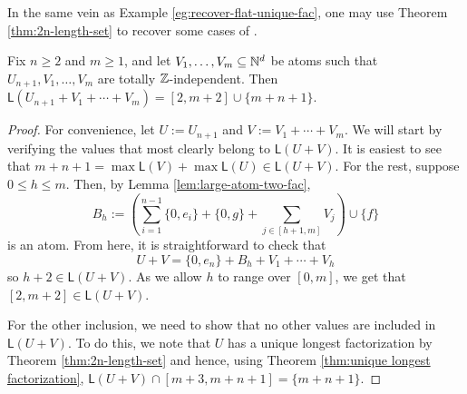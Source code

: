 \begin{rk}
In the same vein as Example \ref{eg:recover-flat-unique-fac}, one may use Theorem \ref{thm:2n-length-set} to recover some cases of \cite[Proposition 4.8]{fan-tringali18}.
\end{rk}


\begin{cor} \label{thm:int-point-construction}
Fix $n\ge 2$ and $m\ge 1$, and let $V_1,\dots, V_m \subseteq \mathbb{N}^d$ be atoms such that $U_{n+1},V_1,\dots, V_m$ are totally $\mathbb{Z}$-independent.
Then $\mathsf{L}(U_{n+1}+V_1+\cdots+V_m) = [ 2,m+2 ] \cup \{m+n+1\}$.
\end{cor}

\begin{proof}
For convenience, let $U := U_{n+1}$ and $V := V_1 + \cdots + V_m$.
We will start by verifying the values that most clearly belong to $\mathsf{L}(U+V)$.
It is easiest to see that $m+n+1 =\max\mathsf{L}(V)+\max\mathsf{L}(U) \in \mathsf{L}(U+V)$.
For the rest, suppose $0\le h \le m$.
Then, by Lemma \ref{lem:large-atom-two-fac}, 
\[B_h := \left( \sum_{i=1}^{n-1} \{0,e_i\} + \{0,g\} + \sum_{j\in [ h+1,m ]} V_j \right) \cup \{f\} \]
is an atom.
From here, it is straightforward to check that
\[ U+ V = \{0,e_n\} + B_h + V_1 + \cdots + V_h \]
so $h+2 \in \mathsf{L}(U+V)$.
As we allow $h$ to range over $[ 0,m ]$, we get that $[ 2,m+2 ] \in \mathsf{L}(U+V)$.

For the other inclusion, we need to show that no other values are included in $\mathsf{L}(U+V)$.
To do this, we note that $U$ has a unique longest factorization by Theorem \ref{thm:2n-length-set} and hence, using Theorem \ref{thm:unique longest factorization}, $\mathsf{L}(U+V) \cap [ m+3, m+n+1 ] = \{m+n+1\}$.
\end{proof}



